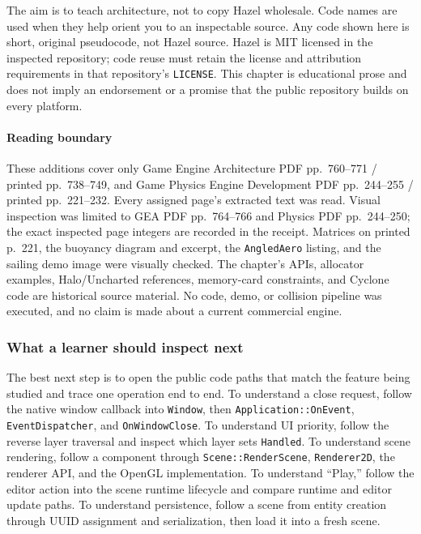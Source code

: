 The aim is to teach architecture, not to copy Hazel wholesale. Code names are used when they help orient you to an inspectable source. Any code shown here is short, original pseudocode, not Hazel source. Hazel is MIT licensed in the inspected repository; code reuse must retain the license and attribution requirements in that repository's \texttt{LICENSE}. This chapter is educational prose and does not imply an endorsement or a promise that the public repository builds on every platform.

\paragraph{Reading boundary}\label{06-engine-ii-ch042-reading-boundary}

\hypertarget{06-engine-ii-ch042-reading-boundary}{}

These additions cover only Game Engine Architecture PDF pp.~760--771 / printed pp.~738--749, and Game Physics Engine Development PDF pp.~244--255 / printed pp.~221--232. Every assigned page's extracted text was read. Visual inspection was limited to GEA PDF pp.~764--766 and Physics PDF pp.~244--250; the exact inspected page integers are recorded in the receipt. Matrices on printed p.~221, the buoyancy diagram and excerpt, the \texttt{AngledAero} listing, and the sailing demo image were visually checked. The chapter's APIs, allocator examples, Halo/Uncharted references, memory-card constraints, and Cyclone code are historical source material. No code, demo, or collision pipeline was executed, and no claim is made about a current commercial engine.

\subsubsection{What a learner should inspect next}\label{06-engine-ii-ch042-what-a-learner-should-inspect-next}

\hypertarget{06-engine-ii-ch042-what-a-learner-should-inspect-next}{}

The best next step is to open the public code paths that match the feature being studied and trace one operation end to end. To understand a close request, follow the native window callback into \texttt{Window}, then \texttt{Application::OnEvent}, \texttt{EventDispatcher}, and \texttt{OnWindowClose}. To understand UI priority, follow the reverse layer traversal and inspect which layer sets \texttt{Handled}. To understand scene rendering, follow a component through \texttt{Scene::RenderScene}, \texttt{Renderer2D}, the renderer API, and the OpenGL implementation. To understand ``Play,'' follow the editor action into the scene runtime lifecycle and compare runtime and editor update paths. To understand persistence, follow a scene from entity creation through UUID assignment and serialization, then load it into a fresh scene.

